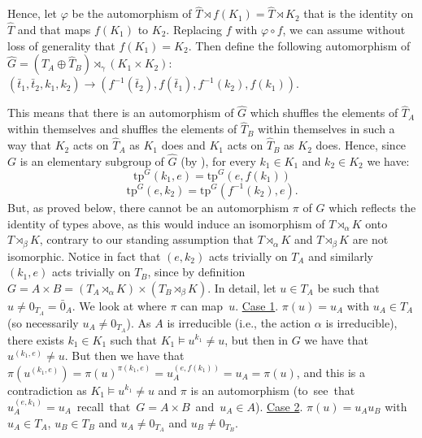 \documentclass[a4paper, 11pt]{amsart}
\theoremstyle{definition}
\theoremstyle{remark}
\begin{document}
\smallskip \noindent
Hence, let $\varphi$ be the automorphism of $\widehat{T} \rtimes f(K_1)=\widehat{T} \rtimes K_2$ that is the identity on $\widehat{T}$ and that maps $f(K_1)$ to $K_2$. Replacing $f$ with $\varphi \circ f$, we can assume without loss of generality that $f(K_1) = K_2$.
Then define the following automorphism of $\widehat{G} = (\widehat{T}_A \oplus \widehat{T}_B) \rtimes_\gamma (K_1 \times K_2)$: $(\bar{t}_1, \bar{t}_2, k_1, k_2) \rightarrow (f^{-1}(\bar{t}_2), f(\bar{t}_1), f^{-1}(k_2), f(k_1))$.

\smallskip \noindent
This means that there is an automorphism of $\widehat{G}$ which shuffles the elements of $\widehat{T}_A$ within themselves and shuffles the elements of $\widehat{T}_B$ within themselves in such a way that $K_2$ acts on $\widehat{T}_A$ as $K_1$ does and $K_1$ acts on $\widehat{T}_B$ as $K_2$ does.
Hence,  since $G$ is an elementary subgroup of $\widehat{G}$ (by \cite{Oger88}), for every $k_1 \in K_1$ and $k_2 \in K_2$ we have:
$$\mathrm{tp}^G(k_1, e) = \mathrm{tp}^G(e, f(k_1))$$
$$\mathrm{tp}^G(e, k_2) = \mathrm{tp}^G(f^{-1}(k_2), e).$$
But, as proved below, there cannot be an automorphism $\pi$ of $G$ which reflects the identity of types above, as this would induce an isomorphism of $T \rtimes_\alpha K$ onto $ T \rtimes_\beta K$, contrary to our standing assumption that $T \rtimes_\alpha K$ and $ T \rtimes_\beta K$ are not isomorphic. Notice in fact that $(e, k_2)$ acts trivially on $T_A$ and similarly $(k_1, e)$ acts trivially on $T_B$, since by definition $G = A \times B = (T_A \rtimes_\alpha K) \times (T_B \rtimes_\beta K)$. In detail, let $u \in T_A$ be such that $u \neq 0_{T_A} = \bar{0}_A$. We look at where $\pi$ can map~$u$. 
%
\newline \underline{Case 1}. $\pi(u) = u_A$ with $u_A \in T_A$ (so necessarily $u_A \neq 0_{T_A}$).
\newline As $A$ is irreducible (i.e., the action $\alpha$ is irreducible), there exists $k_1 \in K_1$ such that $K_1 \models u^{k_1} \neq u$, but then in $G$ we have that $u^{(k_1, e)} \neq u$. But then we have that $\pi(u^{(k_1, e)}) = \pi(u)^{\pi(k_1, e)} = u_A^{(e, f(k_1))} = u_A = \pi(u)$, and this is a contradiction as $K_1 \models u^{k_1} \neq u$ and $\pi$ is an automorphism \mbox{(to see that $u_A^{(e, k_1)} = u_A$ recall that $G = A \times B$ and $u_A \in A$).}
\newline \underline{Case 2}. $\pi(u) = u_Au_B$ with $u_A \in T_A$, $u_B \in T_B$ and $u_A \neq 0_{T_A}$ and $u_B \neq 0_{T_B}$.
\end{document}
